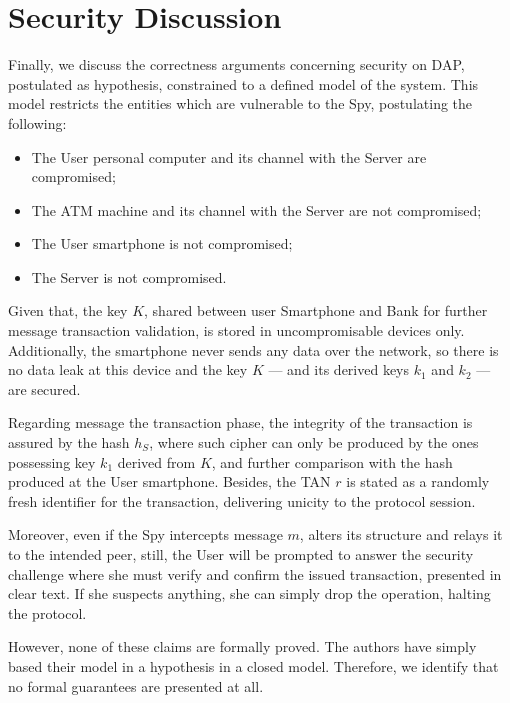 \section{Security Discussion}
Finally, we discuss the correctness arguments concerning security on DAP, postulated as hypothesis, constrained to a defined model of the system. This model restricts the entities which are vulnerable to the Spy, postulating the following:

\begin{itemize}
  \item The User personal computer and its channel with the Server are compromised;
  \item The ATM machine and its channel with the Server are not compromised;
  \item The User smartphone is not compromised;
  \item The Server is not compromised.
\end{itemize}

Given that, the key \(K\), shared between user Smartphone and Bank for further message transaction validation, is stored in uncompromisable devices only. Additionally, the smartphone never sends any data over the network, so there is no data leak at this device and the key \(K\) --- and its derived keys \(k_1\) and \(k_2\) --- are secured.

Regarding message the transaction phase, the integrity of the transaction is assured by the hash \(h_S\), where such cipher can only be produced by the ones possessing key \(k_1\) derived from \(K\), and further comparison with the hash produced at the User smartphone. Besides, the TAN \(r\) is stated as a randomly fresh identifier for the transaction, delivering unicity to the protocol session.

Moreover, even if the Spy intercepts message \(m\), alters its structure and relays it to the intended peer, still, the User will be prompted to answer the security challenge where she must verify and confirm the issued transaction, presented in clear text. If she suspects anything, she can simply drop the operation, halting the protocol.

However, none of these claims are formally proved. The authors have simply based their model in a hypothesis in a closed model. Therefore, we identify that no formal guarantees are presented at all.
